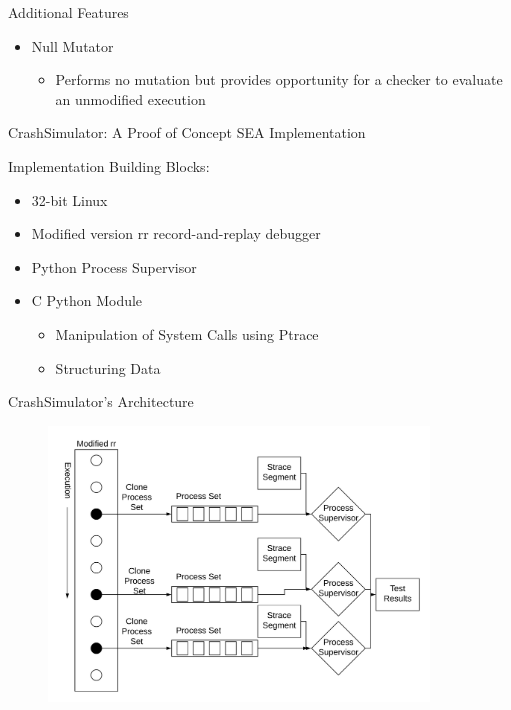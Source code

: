 \documentclass[pdf]{beamer}
\begin{document}
\begin{frame}{Additional Features}
  \begin{itemize}
    \item{Null Mutator}
      \begin{itemize}
        \item{Performs no mutation but provides opportunity for a checker to
          evaluate an unmodified execution}
      \end{itemize}
  \end{itemize}
\end{frame}


\begin{frame}{CrashSimulator: A Proof of Concept SEA Implementation}

  Implementation Building Blocks:

  \begin{itemize}
    \item{32-bit Linux}
    \item{Modified version rr record-and-replay debugger}
    \item{Python Process Supervisor}
    \item{C Python Module}
      \begin{itemize}
        \item{Manipulation of System Calls using Ptrace}
        \item{Structuring Data}
      \end{itemize}
  \end{itemize}
\end{frame}


\begin{frame}{CrashSimulator's Architecture}
    \begin{figure}
    \centering
    \includegraphics[width = 0.9\textwidth]{images/architecture}
  \end{figure}
\end{frame}
\end{document}
